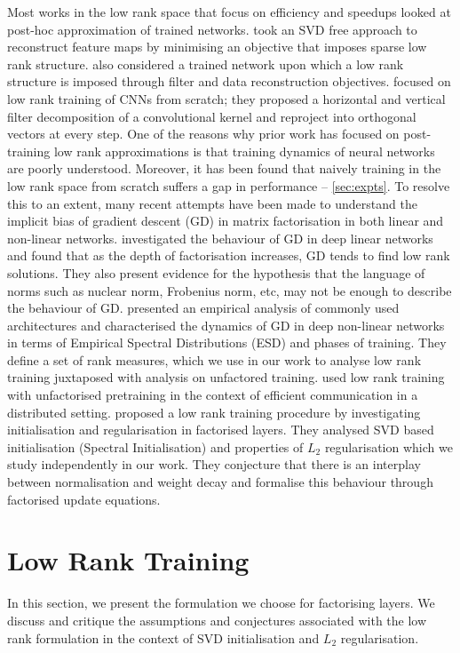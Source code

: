 \documentclass{article}
\begin{document}
Most works in the low rank space that focus on efficiency and speedups looked at post-hoc approximation of trained networks. \cite{cvprcompression} took an SVD free approach to reconstruct feature maps by minimising an objective that imposes sparse low rank structure. \cite{filteranddata} also considered a trained network upon which a low rank structure is imposed through filter and data reconstruction objectives. \cite{lowrankcnns} focused on low rank training of CNNs from scratch; they proposed a horizontal and vertical filter decomposition of a convolutional kernel and reproject into orthogonal vectors at every step. One of the reasons why prior work has focused on post-training low rank approximations is that training dynamics of neural networks are poorly understood. Moreover, it has been found that naively training in the low rank space from scratch suffers a gap in performance -- \cref{sec:expts}. To resolve this to an extent, many recent attempts have been made to understand the implicit bias of gradient descent (GD) in matrix factorisation in both linear and non-linear networks. \cite{implicitreg} investigated the behaviour of GD in deep linear networks and found that as the depth of factorisation increases, GD tends to find low rank solutions. They also present evidence for the hypothesis that the language of norms such as nuclear norm, Frobenius norm, etc,  may not be enough to describe the behaviour of GD.  \cite{implicitregmahoney} presented an empirical analysis of commonly used architectures and characterised the dynamics of GD in deep non-linear networks in terms of Empirical Spectral Distributions (ESD) and phases of training. They define a set of rank measures, which we use in our work to analyse low rank training juxtaposed with analysis on unfactored training. \cite{pufferfish} used low rank training with unfactorised pretraining in the context of efficient communication in a distributed setting. \cite{khodak2021initialization} proposed a low rank training procedure by investigating initialisation and regularisation in factorised layers. They analysed SVD based initialisation (Spectral Initialisation) and properties of $L_2$ regularisation which we study independently in our work. They conjecture that there is an interplay between normalisation and weight decay and formalise this behaviour through factorised update equations.
\vspace{-2mm}
\section{Low Rank Training}
In this section, we present the formulation we choose for factorising layers. We discuss and critique the assumptions and conjectures associated with the low rank formulation in the context of SVD initialisation and $L_2$ regularisation.
\end{document}
